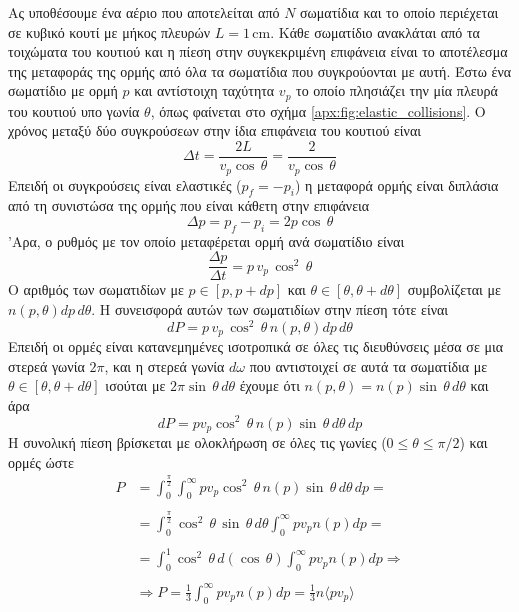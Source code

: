 Ας υποθέσουμε ένα αέριο που αποτελείται από $N$ σωματίδια και το οποίο περιέχεται σε κυβικό κουτί με μήκος πλευρών $L = 1 \,\text{cm}$. Κάθε σωματίδιο ανακλάται από τα τοιχώματα του κουτιού και η πίεση στην συγκεκριμένη επιφάνεια είναι το αποτέλεσμα της μεταφοράς της ορμής από όλα τα σωματίδια που συγκρούονται με αυτή. Έστω ένα σωματίδιο με ορμή $p$ και αντίστοιχη ταχύτητα $v_p$ το οποίο πλησιάζει την μία πλευρά του κουτιού υπο γωνία $\theta$, όπως φαίνεται στο σχήμα \ref{apx:fig:elastic_collisions}. Ο χρόνος μεταξύ δύο συγκρούσεων στην ίδια επιφάνεια του κουτιού είναι
\begin{equation*}
    \Delta t = \frac{2L}{v_p \cos \,\theta} = \frac{2}{v_p \cos \,\theta}
\end{equation*}
Επειδή οι συγκρούσεις είναι ελαστικές ($p_f = - p_i$) η μεταφορά ορμής είναι διπλάσια από τη συνιστώσα της ορμής που είναι κάθετη στην επιφάνεια
\begin{equation*}
    \Delta p = p_f - p_i = 2p \cos \,\theta
\end{equation*}
'Αρα, ο ρυθμός με τον οποίο μεταφέρεται ορμή ανά σωματίδιο είναι
\begin{equation*}
    \frac{\Delta p}{\Delta t} = p \,v_p \,\cos^2 \,\theta
\end{equation*}
Ο αριθμός των σωματιδίων με $p \in [p,p+dp]$ και $\theta \in [\theta, \theta+d\theta]$ συμβολίζεται με $n(p, \theta) dp \,d\theta$. Η συνεισφορά αυτών των σωματιδίων στην πίεση τότε είναι
\begin{equation*}
    dP =  p \,v_p \,\cos^2 \,\theta \,n(p, \theta) dp \,d\theta
\end{equation*}
Επειδή οι ορμές είναι κατανεμημένες ισοτροπικά σε όλες τις διευθύνσεις μέσα σε μια στερεά γωνία $2\pi$, και η στερεά γωνία $d\omega$ που αντιστοιχεί σε αυτά τα σωματίδια με $\theta \in [\theta, \theta+d\theta]$ ισούται με $2\pi \sin \,\theta \,d\theta$ έχουμε ότι $n(p, \theta) = n(p) \sin \,\theta \,d\theta$ και άρα
\begin{equation*}
    dP = p v_p \cos^2 \,\theta \,n(p) \sin \,\theta \,d\theta \,dp
\end{equation*}
Η συνολική πίεση βρίσκεται με ολοκλήρωση σε όλες τις γωνίες ($0 \leq \theta \leq \pi/2$) και ορμές ώστε
\begin{align*}
    P &= \int_{0}^{\frac{\pi}{2}} \int_{0}^{\infty} p v_p \cos^2 \,\theta \,n(p) \sin \,\theta \,d\theta \,dp = \\\\
    &=\int_{0}^{\frac{\pi}{2}} \cos^2 \,\theta \,\sin \,\theta \,d\theta \int_{0}^{\infty} p v_p n(p) dp = \\\\
    &= \int_{0}^{1} \cos^2 \,\theta \, d(\cos \,\theta) \int_{0}^{\infty} p v_p n(p) dp \Rightarrow \\\\
    &\Rightarrow P = \frac{1}{3} \int_{0}^{\infty} p v_p n(p) dp = \frac{1}{3} n \langle p v_p \rangle
\end{align*}

